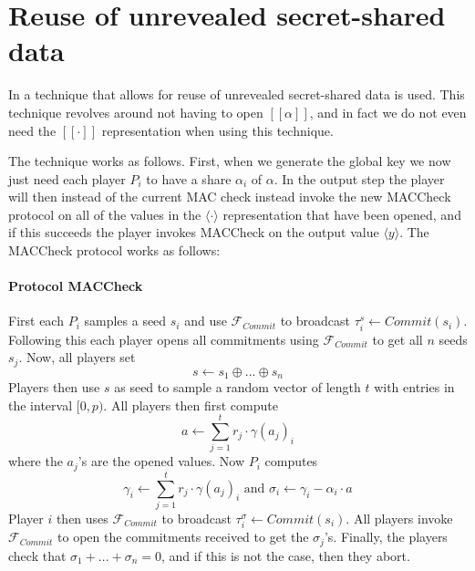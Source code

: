 \documentclass{article}
\begin{document}

\section{Reuse of unrevealed secret-shared data} \label{section: Reuse}
In \cite{damgaard2013practical} a technique that allows for reuse of unrevealed secret-shared data is used. This technique revolves around not having to open $[\![ \alpha ]\!]$, and in fact we do not even need the $[\![ \cdot ]\!]$ representation when using this technique.

The technique works as follows. First, when we generate the global key we now just need each player $P_i$ to have a share $\alpha_i$ of $\alpha$. In the output step the player will then instead of the current MAC check instead invoke the new MACCheck protocol on all of the values in the $\langle \cdot \rangle$ representation that have been opened, and if this succeeds the player invokes MACCheck on the output value $\langle y \rangle$. The MACCheck protocol works as follows:
\paragraph{Protocol MACCheck}
First each $P_i$ samples a seed $s_i$ and use $\mathcal{F}_{Commit}$ to broadcast $\tau^s_i \leftarrow Commit(s_i)$. Following this each player opens all commitments using $\mathcal{F}_{Commit}$ to get all $n$ seeds $s_j$. Now, all players set $$s \leftarrow s_1 \oplus ... \oplus s_n$$
Players then use $s$ as seed to sample a random vector of length $t$ with entries in the interval $[0, p)$. %
All players then first compute $$a \leftarrow \sum^t_{j = 1} r_j \cdot \gamma(a_j)_i$$ where the $a_j$'s are the opened values.
Now $P_i$ computes $$\gamma_i \leftarrow \sum^t_{j = 1} r_j \cdot \gamma(a_j)_i \text{  and  } \sigma_i \leftarrow \gamma_i - \alpha_i \cdot a$$
Player $i$ then uses $\mathcal{F}_{Commit}$ to broadcast $\tau^\sigma_i \leftarrow Commit(s_i)$.
All players invoke $\mathcal{F}_{Commit}$ to open the commitments received to get the $\sigma_j$'s.
Finally, the players check that $\sigma_1 + ... + \sigma_n = 0$, and if this is not the case, then they abort.
\end{document}
